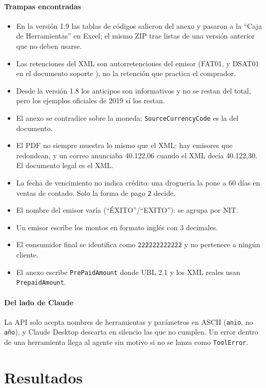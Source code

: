 \documentclass[conference,a4paper]{IEEEtran}
\newcommand{\cod}[1]{\texttt{\small #1}}
\begin{document}
\paragraph*{Trampas encontradas}
\begin{itemize}
  \item En la versión 1.9 las tablas de códigos salieron del anexo y pasaron a la ``Caja de Herramientas'' en Excel; el mismo ZIP trae listas de una versión anterior que no deben usarse.
  \item Las retenciones del XML son autorretenciones del emisor (FAT01, y DSAT01 en el documento soporte \cite{anexoDS11}), no la retención que practica el comprador.
  \item Desde la versión 1.8 los anticipos son informativos y no se restan del total, pero los ejemplos oficiales de 2019 sí los restan.
  \item El anexo se contradice sobre la moneda; \cod{SourceCurrencyCode} es la del documento.
  \item El PDF no siempre muestra lo mismo que el XML: hay emisores que redondean, y un correo anunciaba 40.122,06 cuando el XML decía 40.122,30. El documento legal es el XML.
  \item La fecha de vencimiento no indica crédito: una droguería la pone a 60 días en ventas de contado. Solo la forma de pago \cod{2} decide.
  \item El nombre del emisor varía (``ÉXITO''/``EXITO''): se agrupa por NIT.
  \item Un emisor escribe los montos en formato inglés con 3 decimales.
  \item El consumidor final se identifica como \cod{222222222222} y no pertenece a ningún cliente.
  \item El anexo escribe \cod{PrePaidAmount} donde UBL 2.1 y los XML reales usan \cod{PrepaidAmount}.
\end{itemize}

\paragraph*{Del lado de Claude} La API solo acepta nombres de herramientas y parámetros en ASCII (\cod{anio}, no \cod{año}), y Claude Desktop descarta en silencio las que no cumplen. Un error dentro de una herramienta llega al agente sin motivo si no se lanza como \cod{ToolError}.

\section{Resultados}
\end{document}
